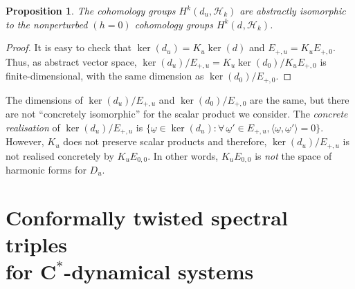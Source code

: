 \documentclass[pdftex]{sigma}
\newtheorem{Proposition}[Theorem]{Proposition}
 { \theoremstyle{definition}
\newtheorem{Definition}[Theorem]{Definition}
\newtheorem{Note}[Theorem]{Note}
\newtheorem{Example}[Theorem]{Example}
\newtheorem{Remark}[Theorem]{Remark} }
\newcommand{\Complex}[1][]{(d_{#1}, \Hh_k)}
\newcommand{\Hh}{\mathscr{H}}
\newcommand{\omegat}{\underline{\omega}}
\numberwithin{equation}{section}
\begin{document}
\begin{Proposition}
\label{Prop:Stability}
The cohomology groups $H^k\Complex[u]$ are abstractly isomorphic to the nonperturbed $(h = 0)$ cohomology groups $H^k\Complex$.
\end{Proposition}

\begin{proof}
It is easy to check that $\ker(d_u) = K_u \ker(d)$ and $E_{+, u} = K_u E_{+,0}$. Thus, as abstract vector space, $\ker(d_u)/E_{+,u} = K_u \ker(d_0)/ K_u E_{+,0}$ is f\/inite-dimensional, with the same dimension as $\ker(d_0)/E_{+,0}$.
\end{proof}

\begin{Remark}
The dimensions of $\ker(d_u)/E_{+,u}$ and $\ker(d_0)/E_{+,0}$ are the same, but there are not ``{concretely} isomorphic'' for the scalar product we consider. The \emph{concrete realisation} of $\ker(d_u)/E_{+, u}$ is $\{ \omegat \in \ker(d_u)\colon \forall\, \omegat' \in E_{+,u}, \langle \omegat, \omegat' \rangle = 0 \}$. However, $K_u$ does not preserve scalar products and therefore, $\ker(d_u)/E_{+,u}$ is not realised concretely by $K_u E_{0,0}$. In other words, $K_u E_{0,0}$ is \emph{not} the space of harmonic forms for $D_u$.
\end{Remark}

\section[Conformally twisted spectral triples for $C^*$-dynamical systems]{Conformally twisted spectral triples\\ for $\boldsymbol{C^*}$-dynamical systems}
\label{Sec:ConfTwistedTrSp}
\end{document}
